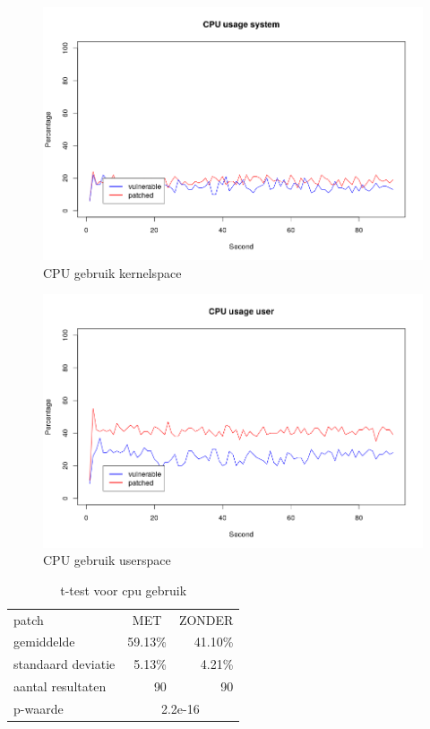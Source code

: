 \begin{figure}
	\includegraphics[width=1.0\linewidth]{img/cpu_system.png}
	\caption{CPU gebruik kernelspace}
	\label{fig:cpu_system}
\end{figure}

\begin{figure}
	\includegraphics[width=1.0\linewidth]{img/cpu_user.png}
	\caption{CPU gebruik userspace}
	\label{fig:cpu_user}
\end{figure}

\begin{table}[]
	\centering
	\caption{t-test voor cpu gebruik}
	\label{t_cpu}
\begin{tabular}{l|rr}
	\hline
	patch              & \multicolumn{1}{c}{MET} & \multicolumn{1}{c}{ZONDER} \\
	gemiddelde         & 59.13\%                 & 41.10\%                    \\
	standaard deviatie & 5.13\%                  & 4.21\%                     \\
	aantal resultaten  & 90                      & 90                         \\ \hline
	p-waarde           & \multicolumn{2}{c|}{2.2e-16}                        
\end{tabular}


\end{table}

